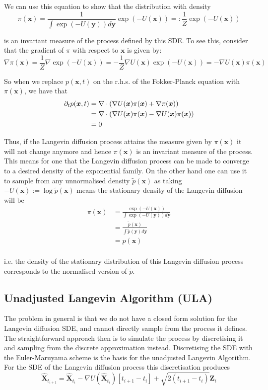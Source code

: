 We can use this equation to show that the distribution with density
\[
	\pi(\bm{x}) = \frac{ 1 }{ \int \exp(-U(\bm{y})) d\bm{y} }  \exp(-U(\bm{x})) =: \frac{ 1 }{ Z } \exp(-U(\bm{x}))
\]

is an invariant measure of the process defined by this SDE. 
To see this, consider that the gradient of $\pi$ with respect to $\bm{x}$ is given by:
\[
	\nabla \pi(\bm{x}) 
	= \frac{ 1 }{ Z } \nabla \exp( -U(\bm{x}) )
	= - \frac{ 1 }{ Z } \nabla U(\bm{x}) \exp( -U(\bm{x}) )
	= - \nabla U(\bm{x}) \pi(\bm{x})
\]

So when we replace $p(\bm{x}, t)$ on the r.h.s. of the Fokker-Planck equation with $\pi(\bm{x})$, we have that
\[
\begin{aligned}
	\partial_t p(\bm{x},t) 
	&= \nabla \cdot \left( \nabla U(\bm{x}) \pi(\bm{x}) + \nabla \pi(\bm{x}) \right) \\
	&= \nabla \cdot \left( \nabla U(\bm{x}) \pi(\bm{x}) - \nabla U(\bm{x}) \pi(\bm{x}) \right) \\
	&= 0 \\
\end{aligned}
\]

Thus, if the Langevin diffusion process attains the measure given by $\pi(\bm{x})$ it will not change anymore and hence $\pi(\bm{x})$ is an invariant measure of the process.
This means for one that the Langevin diffusion process can be made to converge to a desired density of the exponential family.
On the other hand one can use it to sample from any unnormalised density $\tilde{p}(\bm{x})$ as taking $-U(\bm{x}) := \log \tilde{p}(\bm{x})$
means the stationary density of the Langevin diffusion will be
\[
\begin{aligned}
	\pi(\bm{x}) 
	&= \frac{ \exp(-U(\bm{x})) }{ \int \exp(-U(\bm{y})) d\bm{y} } \\
	&= \frac{ \tilde{p}(\bm{x}) }{ \int \tilde{p}(\bm{y}) d\bm{y} } \\
	&= p(\bm{x}) \\
\end{aligned}
\]

i.e. the density of the stationary distribution of this Langevin diffusion process corresponds to the normalised version of $\tilde{p}$.


\subsection{Unadjusted Langevin Algorithm (ULA)}

The problem in general is that we do not have a closed form solution for the Langevin diffusion SDE, and cannot directly sample from the process it defines.
The straightforward approach then is to simulate the process by discretising it and sampling from the discrete approximation instead.
Discretising the SDE with the Euler-Maruyama scheme is the basis for the unadjusted Langevin Algorithm. 
For the SDE of the Langevin diffusion process this discretisation produces
\[
	\hat{\bm{X}}_{t_{i+1}} = \hat{\bm{X}}_{t_i} - \nabla U( \hat{\bm{X}}_{t_i} ) [t_{i+1} - t_i] + \sqrt{2 (t_{i+1} - t_i)} \bm{Z}_i
\]

